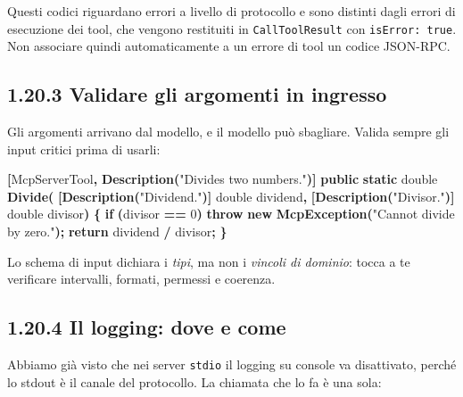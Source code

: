 \documentclass[
  italian,
  10pt,
]{book}
\newenvironment{Shaded}{\begin{snugshade}}{\end{snugshade}}
\newcommand{\DataTypeTok}[1]{\textcolor[rgb]{0.13,0.29,0.53}{#1}}
\newcommand{\DecValTok}[1]{\textcolor[rgb]{0.00,0.00,0.81}{#1}}
\newcommand{\FunctionTok}[1]{\textcolor[rgb]{0.13,0.29,0.53}{\textbf{#1}}}
\newcommand{\KeywordTok}[1]{\textcolor[rgb]{0.13,0.29,0.53}{\textbf{#1}}}
\newcommand{\NormalTok}[1]{#1}
\newcommand{\OperatorTok}[1]{\textcolor[rgb]{0.81,0.36,0.00}{\textbf{#1}}}
\newcommand{\StringTok}[1]{\textcolor[rgb]{0.31,0.60,0.02}{#1}}
\begin{document}
\normalsize

Questi codici riguardano errori a livello di protocollo e sono distinti
dagli errori di esecuzione dei tool, che vengono restituiti in
\texttt{CallToolResult} con \texttt{isError:\ true}. Non associare
quindi automaticamente a un errore di tool un codice JSON-RPC.

\subsection{1.20.3 Validare gli argomenti in
ingresso}\label{validare-gli-argomenti-in-ingresso}

Gli argomenti arrivano dal modello, e il modello può sbagliare. Valida
sempre gli input critici prima di usarli:

\begin{Shaded}
\begin{Highlighting}[]
\OperatorTok{[}\NormalTok{McpServerTool}\OperatorTok{,} \FunctionTok{Description}\OperatorTok{(}\StringTok{"Divides two numbers."}\OperatorTok{)]}
\KeywordTok{public} \KeywordTok{static} \DataTypeTok{double} \FunctionTok{Divide}\OperatorTok{(}
    \OperatorTok{[}\FunctionTok{Description}\OperatorTok{(}\StringTok{"Dividend."}\OperatorTok{)]} \DataTypeTok{double}\NormalTok{ dividend}\OperatorTok{,}
    \OperatorTok{[}\FunctionTok{Description}\OperatorTok{(}\StringTok{"Divisor."}\OperatorTok{)]} \DataTypeTok{double}\NormalTok{ divisor}\OperatorTok{)}
\OperatorTok{\{}
    \KeywordTok{if} \OperatorTok{(}\NormalTok{divisor }\OperatorTok{==} \DecValTok{0}\OperatorTok{)}
        \KeywordTok{throw} \KeywordTok{new} \FunctionTok{McpException}\OperatorTok{(}\StringTok{"Cannot divide by zero."}\OperatorTok{);}
    \KeywordTok{return}\NormalTok{ dividend }\OperatorTok{/}\NormalTok{ divisor}\OperatorTok{;}
\OperatorTok{\}}
\end{Highlighting}
\end{Shaded}

Lo schema di input dichiara i \emph{tipi}, ma non i \emph{vincoli di
dominio}: tocca a te verificare intervalli, formati, permessi e
coerenza.

\subsection{1.20.4 Il logging: dove e
come}\label{il-logging-dove-e-come}

Abbiamo già visto che nei server \texttt{stdio} il logging su console va
disattivato, perché lo stdout è il canale del protocollo. La chiamata
che lo fa è una sola:
\end{document}
